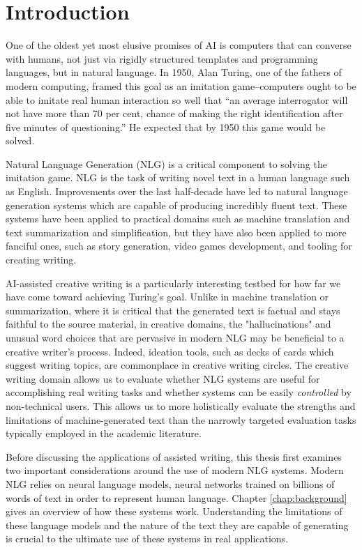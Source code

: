 \chapter{Introduction} \label{chap:intro}

One of the oldest yet most elusive promises of AI is computers that can converse with humans, not just via rigidly structured templates and programming languages, but in natural language.
In 1950, Alan Turing, one of the fathers of modern computing, framed this goal as an imitation game--computers ought to be able to imitate real human interaction so well that ``an average interrogator will not have more than 70 per cent, chance of making the right identification after five minutes of questioning.''
He expected that by 1950 this game would be solved.

Natural Language Generation (NLG) is a critical component to solving the imitation game.
NLG is the task of writing novel text in a human language such as English. 
Improvements over the last half-decade have led to natural language generation systems which are capable of producing incredibly fluent text.
These systems have been applied to practical domains such as machine translation and text summarization and simplification, but they have also been applied to more fanciful ones, such as story generation, video games development, and tooling for creating writing.

AI-assisted creative writing is a particularly interesting testbed for how far we have come toward achieving Turing's goal.
Unlike in machine translation or summarization, where it is critical that the generated text is factual and stays faithful to the source material, in creative domains, the "hallucinations" and unusual word choices that are pervasive in modern NLG may be beneficial to a creative writer's process.
Indeed, ideation tools, such as decks of cards which suggest writing topics, are commonplace in creative writing circles.
The creative writing domain allows us to evaluate whether NLG systems are useful for accomplishing real writing tasks and whether systems can be easily \textit{controlled} by non-technical users.
This allows us to more holistically evaluate the strengths and limitations of machine-generated text than the narrowly targeted evaluation tasks typically employed in the academic literature.

Before discussing the applications of assisted writing, this thesis first examines two important considerations around the use of modern NLG systems.
Modern NLG relies on neural language models, neural networks trained on billions of words of text in order to represent human language.
Chapter \ref{chap:background} gives an overview of how these systems work. 
Understanding the limitations of these language models and the nature of the text they are capable of generating is crucial to the ultimate use of these systems in real applications.


